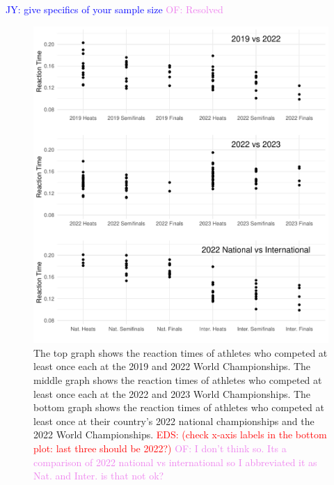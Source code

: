 \documentclass[12pt, letterpaper, titlepage]{article}
\newcommand{\jy}[1]{\textcolor{blue}{JY: #1}}
\newcommand{\eds}[1]{\textcolor{red}{EDS: (#1)}}
\newcommand{\of}[1]{\textcolor{violet}{OF: #1}}
\begin{document}
\jy{give specifics of your sample size}
\of{Resolved}

\begin{figure}[tbp]
  \centering
  \includegraphics{RankScatterPlots}
  \caption{The top graph shows the reaction times of athletes who competed at 
	least once each at the 2019 and 2022 World Championships. The middle graph 
	shows the reaction times of athletes who competed at least once each at the 
	2022 and 2023 World Championships. The bottom graph shows the reaction times 
	of athletes who competed at least once at their country's
  2022 national championships and the 2022 World Championships.
	\eds{check x-axis labels in the bottom plot: last three should be 2022?}
  \of{I don't think so. Its a comparison of 2022 national vs international so
  I abbreviated it as Nat. and Inter. is that not ok?}}
  \label{fig:RankScatterplots}
\end{figure}
\end{document}
